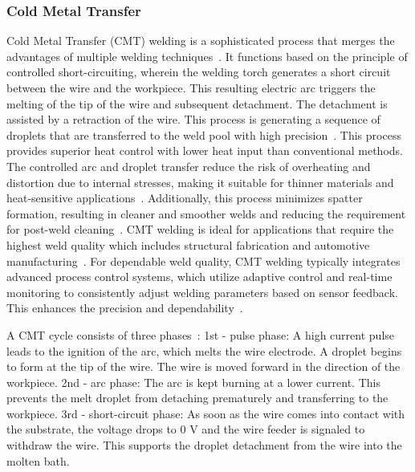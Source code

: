 \subsubsection{Cold Metal Transfer}\label{CMTc}


Cold Metal Transfer (\acrshort{CMT}) welding is a sophisticated process that merges the advantages of multiple welding techniques~\cite{Dutra.2015}. It functions based on the principle of controlled short-circuiting, wherein the welding torch generates a short circuit between the wire and the workpiece. This resulting electric arc triggers the melting of the tip of the wire and subsequent detachment. The detachment is assisted by a retraction of the wire. This process is generating a sequence of droplets that are transferred to the weld pool with high precision~\cite{Selvi.2018, Srinivasan.2022}. This process provides superior heat control with lower heat input than conventional methods. The controlled arc and droplet transfer reduce the risk of overheating and distortion due to internal stresses, making it suitable for thinner materials and heat-sensitive applications~\cite{Scotti.2020}. Additionally, this process minimizes spatter formation, resulting in cleaner and smoother welds and reducing the requirement for post-weld cleaning~\cite{Srinivasan.2022}. %
\acrshort{CMT} welding is ideal for applications that require the highest weld quality which includes structural fabrication and automotive manufacturing~\cite{Cong.2016}. For dependable weld quality, \acrshort{CMT} welding typically integrates advanced process control systems, which utilize adaptive control and real-time monitoring to consistently adjust welding parameters based on sensor feedback. This enhances the precision and dependability~\cite{Pickin.2006}.

A \acrshort{CMT} cycle consists of three phases~\cite{Selvi.2018}:\newline
1st - pulse phase: A high current pulse leads to the ignition of the arc, 
which melts the wire electrode. A droplet begins to form at the 
tip of the wire. The wire is moved forward in the direction of the 
workpiece.\newline
2nd - arc phase: The arc is kept burning at a lower current. This prevents the melt droplet from detaching prematurely and transferring to the workpiece.\newline
3rd - short-circuit phase: As soon as the wire comes into contact with the substrate, 
the voltage drops to 0 V and the wire feeder is signaled to withdraw the wire. This supports the droplet detachment 
from the wire into the molten bath.

